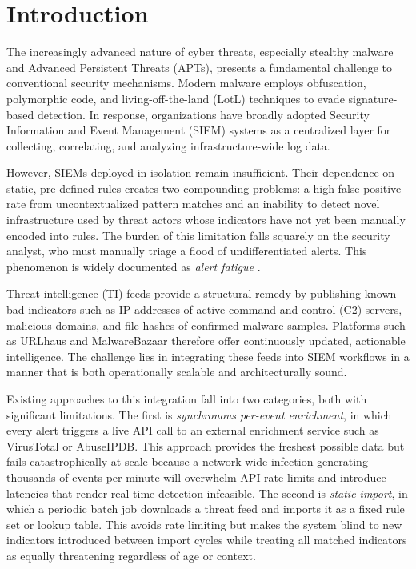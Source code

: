\documentclass[conference]{IEEEtran}
\begin{document}
\section{Introduction}

The increasingly advanced nature of cyber threats, especially stealthy malware and Advanced Persistent Threats (APTs), presents a fundamental challenge to conventional security mechanisms. Modern malware employs obfuscation, polymorphic code, and living-off-the-land (LotL) techniques to evade signature-based detection. In response, organizations have broadly adopted Security Information and Event Management (SIEM) systems as a centralized layer for collecting, correlating, and analyzing infrastructure-wide log data.

However, SIEMs deployed in isolation remain insufficient. Their dependence on static, pre-defined rules creates two compounding problems: a high false-positive rate from uncontextualized pattern matches and an inability to detect novel infrastructure used by threat actors whose indicators have not yet been manually encoded into rules. The burden of this limitation falls squarely on the security analyst, who must manually triage a flood of undifferentiated alerts. This phenomenon is widely documented as \textit{alert fatigue} \cite{enisa}.

Threat intelligence (TI) feeds provide a structural remedy by publishing known-bad indicators such as IP addresses of active command and control (C2) servers, malicious domains, and file hashes of confirmed malware samples. Platforms such as URLhaus and MalwareBazaar therefore offer continuously updated, actionable intelligence. The challenge lies in integrating these feeds into SIEM workflows in a manner that is both operationally scalable and architecturally sound.

Existing approaches to this integration fall into two categories, both with significant limitations. The first is \textit{synchronous per-event enrichment}, in which every alert triggers a live API call to an external enrichment service such as VirusTotal or AbuseIPDB. This approach provides the freshest possible data but fails catastrophically at scale because a network-wide infection generating thousands of events per minute will overwhelm API rate limits and introduce latencies that render real-time detection infeasible. The second is \textit{static import}, in which a periodic batch job downloads a threat feed and imports it as a fixed rule set or lookup table. This avoids rate limiting but makes the system blind to new indicators introduced between import cycles while treating all matched indicators as equally threatening regardless of age or context.
\end{document}
